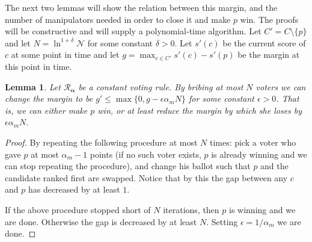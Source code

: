 \documentclass[letterpaper]{article} %
\newtheorem{lemma}[theorem]{Lemma}
\theoremstyle{definition}
\newcommand{\abs}[1]{\lvert #1 \rvert}
\newcommand{\NN}{\mathcal{N}}
\newcommand\vecgreek{\bm}
\newcommand{\veca}{\vecgreek{\alpha}}
\newcommand{\Ra}{\mathcal{R}_{\veca}}
\begin{document}
The next two lemmas will show the relation between this margin, and the number of manipulators needed in order to close it and make $p$ win. The proofs will be constructive and will supply a polynomial-time algorithm. Let $C'=C \setminus \{p\}$ and let $N=\ln ^{1+\delta} \NN$ for some constant $\delta>0$. Let $s'(c)$ be the current score of $c$ at some point in time and let $g = \max_{c \in C' }s'(c)-s'(p)$ be the margin at this point in time.

\begin{lemma}\label{lem:how-to-bribe2}
	Let $\Ra$ be a constant voting rule. By bribing at most $N$ voters we can change the margin to be $g' \leq \max\{0, g - \epsilon\alpha_m N\}$ for some constant $\epsilon>0$. That is, we can either make $p$ win, or at least reduce the margin by which she loses by $\epsilon \alpha_m N$.
\end{lemma}
\begin{proof}
	By repeating the following procedure at most $N$ times: pick a voter who gave $p$ at most $\alpha_m-1 $ points (if no such voter exists, $p$ is already winning and we can stop repeating the procedure), and change his ballot such that $p$ and the candidate ranked first are swapped. Notice that by this the gap between any $c$ and $p$ has decreased by at least $1$.
	
	If the above procedure stopped short of $N$ iterations, then $p$ is winning and we are done. Otherwise the gap is decreased by at least $N$. Setting $\epsilon=1/\alpha_m$ we are done.
\end{proof}


%		
\end{document}
